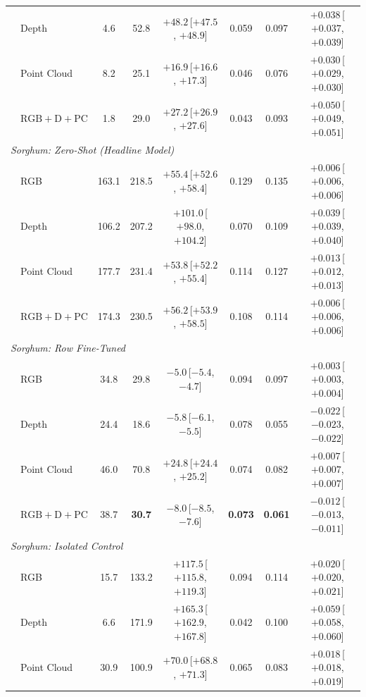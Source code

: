 \begin{table}[t]
\begin{tabular}{l l ccc ccc}
    & Depth & 4.6 & 52.8 & $+48.2$\,{\tiny[$+47.5$, $+48.9$]} & 0.059 & 0.097 & $+0.038$\,{\tiny[$+0.037$, $+0.039$]} \\
    & Point Cloud & 8.2 & 25.1 & $+16.9$\,{\tiny[$+16.6$, $+17.3$]} & 0.046 & 0.076 & $+0.030$\,{\tiny[$+0.029$, $+0.030$]} \\
    & $\mathrm{RGB}+\mathrm{D}+\mathrm{PC}$ & 1.8 & 29.0 & $+27.2$\,{\tiny[$+26.9$, $+27.6$]} & 0.043 & 0.093 & $+0.050$\,{\tiny[$+0.049$, $+0.051$]} \\
    \midrule
    \multicolumn{8}{l}{\emph{Sorghum: Zero-Shot (Headline Model)}} \\
    & RGB & 163.1 & 218.5 & $+55.4$\,{\tiny[$+52.6$, $+58.4$]} & 0.129 & 0.135 & $+0.006$\,{\tiny[$+0.006$, $+0.006$]} \\
    & Depth & 106.2 & 207.2 & $+101.0$\,{\tiny[$+98.0$, $+104.2$]} & 0.070 & 0.109 & $+0.039$\,{\tiny[$+0.039$, $+0.040$]} \\
    & Point Cloud & 177.7 & 231.4 & $+53.8$\,{\tiny[$+52.2$, $+55.4$]} & 0.114 & 0.127 & $+0.013$\,{\tiny[$+0.012$, $+0.013$]} \\
    & $\mathrm{RGB}+\mathrm{D}+\mathrm{PC}$ & 174.3 & 230.5 & $+56.2$\,{\tiny[$+53.9$, $+58.5$]} & 0.108 & 0.114 & $+0.006$\,{\tiny[$+0.006$, $+0.006$]} \\
    \midrule
    \multicolumn{8}{l}{\emph{Sorghum: Row Fine-Tuned}} \\
    & RGB & 34.8 & 29.8 & $-5.0$\,{\tiny[$-5.4$, $-4.7$]} & 0.094 & 0.097 & $+0.003$\,{\tiny[$+0.003$, $+0.004$]} \\
    & Depth & 24.4 & 18.6 & $-5.8$\,{\tiny[$-6.1$, $-5.5$]} & 0.078 & 0.055 & $-0.022$\,{\tiny[$-0.023$, $-0.022$]} \\
    & Point Cloud & 46.0 & 70.8 & $+24.8$\,{\tiny[$+24.4$, $+25.2$]} & 0.074 & 0.082 & $+0.007$\,{\tiny[$+0.007$, $+0.007$]} \\
    & $\mathrm{RGB}+\mathrm{D}+\mathrm{PC}$ & 38.7 & \textbf{30.7} & $-8.0$\,{\tiny[$-8.5$, $-7.6$]} & \textbf{0.073} & \textbf{0.061} & $-0.012$\,{\tiny[$-0.013$, $-0.011$]} \\
    \midrule
    \multicolumn{8}{l}{\emph{Sorghum: Isolated Control}} \\
    & RGB & 15.7 & 133.2 & $+117.5$\,{\tiny[$+115.8$, $+119.3$]} & 0.094 & 0.114 & $+0.020$\,{\tiny[$+0.020$, $+0.021$]} \\
    & Depth & 6.6 & 171.9 & $+165.3$\,{\tiny[$+162.9$, $+167.8$]} & 0.042 & 0.100 & $+0.059$\,{\tiny[$+0.058$, $+0.060$]} \\
    & Point Cloud & 30.9 & 100.9 & $+70.0$\,{\tiny[$+68.8$, $+71.3$]} & 0.065 & 0.083 & $+0.018$\,{\tiny[$+0.018$, $+0.019$]} \\

\end{tabular}
\end{table}
